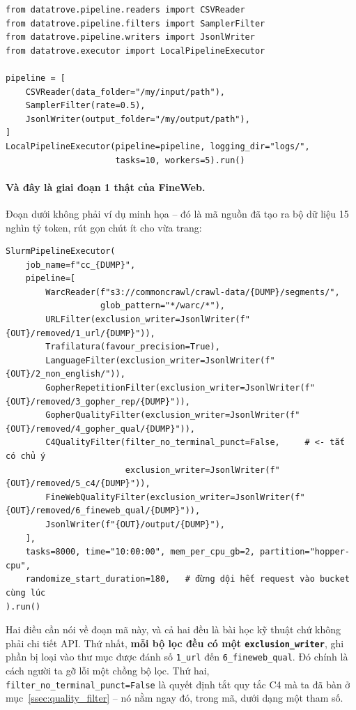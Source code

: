 \begin{verbatim}
from datatrove.pipeline.readers import CSVReader
from datatrove.pipeline.filters import SamplerFilter
from datatrove.pipeline.writers import JsonlWriter
from datatrove.executor import LocalPipelineExecutor

pipeline = [
    CSVReader(data_folder="/my/input/path"),
    SamplerFilter(rate=0.5),
    JsonlWriter(output_folder="/my/output/path"),
]
LocalPipelineExecutor(pipeline=pipeline, logging_dir="logs/",
                      tasks=10, workers=5).run()
\end{verbatim}

\paragraph{Và đây là giai đoạn 1 thật của FineWeb.} Đoạn dưới không phải ví dụ minh họa -- đó là mã nguồn đã tạo ra bộ dữ liệu 15 nghìn tỷ token, rút gọn chút ít cho vừa trang:

\begin{verbatim}
SlurmPipelineExecutor(
    job_name=f"cc_{DUMP}",
    pipeline=[
        WarcReader(f"s3://commoncrawl/crawl-data/{DUMP}/segments/",
                   glob_pattern="*/warc/*"),
        URLFilter(exclusion_writer=JsonlWriter(f"{OUT}/removed/1_url/{DUMP}")),
        Trafilatura(favour_precision=True),
        LanguageFilter(exclusion_writer=JsonlWriter(f"{OUT}/2_non_english/")),
        GopherRepetitionFilter(exclusion_writer=JsonlWriter(f"{OUT}/removed/3_gopher_rep/{DUMP}")),
        GopherQualityFilter(exclusion_writer=JsonlWriter(f"{OUT}/removed/4_gopher_qual/{DUMP}")),
        C4QualityFilter(filter_no_terminal_punct=False,     # <- tắt có chủ ý
                        exclusion_writer=JsonlWriter(f"{OUT}/removed/5_c4/{DUMP}")),
        FineWebQualityFilter(exclusion_writer=JsonlWriter(f"{OUT}/removed/6_fineweb_qual/{DUMP}")),
        JsonlWriter(f"{OUT}/output/{DUMP}"),
    ],
    tasks=8000, time="10:00:00", mem_per_cpu_gb=2, partition="hopper-cpu",
    randomize_start_duration=180,   # đừng dội hết request vào bucket cùng lúc
).run()
\end{verbatim}

\noindent Hai điều cần nói về đoạn mã này, và cả hai đều là bài học kỹ thuật chứ không phải chi tiết API. Thứ nhất, \textbf{mỗi bộ lọc đều có một \texttt{exclusion\_writer}}, ghi phần bị loại vào thư mục được đánh số \texttt{1\_url} đến \texttt{6\_fineweb\_qual}. Đó chính là cách người ta gỡ lỗi một chồng bộ lọc. Thứ hai, \texttt{filter\_\allowbreak no\_\allowbreak terminal\_\allowbreak punct=False} là quyết định tắt quy tắc C4 mà ta đã bàn ở mục~\ref{ssec:quality_filter} -- nó nằm ngay đó, trong mã, dưới dạng một tham số.

